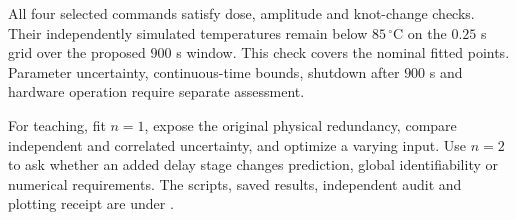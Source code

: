 All four selected commands satisfy dose, amplitude and knot-change checks.
Their independently simulated temperatures remain below $85\,{}^\circ\mathrm C$
on the $0.25$ s grid over the proposed $900$ s window. This check covers the
nominal fitted points. Parameter uncertainty, continuous-time bounds, shutdown
after $900$ s and hardware operation require separate assessment.

For teaching, fit $n=1$, expose the original physical redundancy, compare
independent and correlated uncertainty, and optimize a varying input.
Use $n=2$ to ask whether an added delay stage changes prediction, global
identifiability or numerical requirements. The scripts, saved results,
independent audit and plotting receipt are under
.
